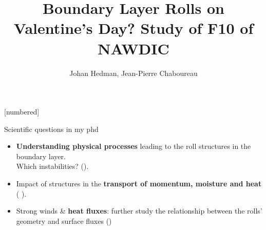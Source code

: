 

\graphicspath{{FIGURES/}}

\usepackage{animate}
\usepackage{graphicx}


\title{Boundary Layer Rolls on Valentine's Day? Study of F10 of NAWDIC}
\author{Johan Hedman, Jean-Pierre Chaboureau}

\usepackage[caption = false]{subfig}
[numbered]


\begin{frame}
\maketitle
\end{frame}

\begin{frame}{Scientific questions in my phd}
	\vfill
	\begin{itemize}
	\item \textbf{Understanding physical processes} leading to the roll structures in the boundary layer. \\
	Which instabilities? (\cite{etlingRollVorticesPlanetary1993}). \\
		\vfill
	\item Impact of structures in the \textbf{transport of momentum, moisture and heat} \\
	( \cite{riviereDownwardTransportMomentum2020}).
		\vfill
	\item Strong winds   \& \textbf{heat fluxes}: further study the relationship between the rolls' geometry and surface fluxes (\cite{lfarhImpactSurfaceTurbulent2024})
\end{itemize}
	\vfill
\end{frame}


